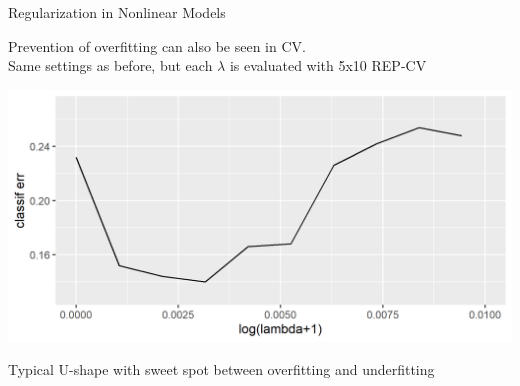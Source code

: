 \documentclass[11pt,compress,t,notes=noshow, xcolor=table]{beamer}
\begin{document}
\begin{frame}{Regularization in Nonlinear Models}

Prevention of overfitting can also be seen in CV.\\
Same settings as before, but each $\lambda$ is evaluated with
5x10 REP-CV

\begin{center}\includegraphics[width=1\textwidth]{figure/fig-regu-nonlin-srm-1.png}\end{center}

Typical U-shape with sweet spot between overfitting and underfitting
\end{frame}
\end{document}
